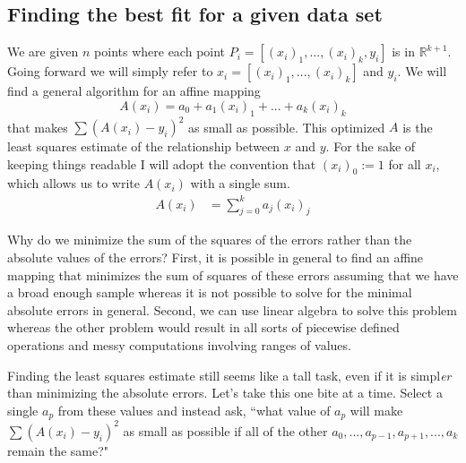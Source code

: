 \subsection{Finding the best fit for a given data set}

We are given $n$ points where each point $P_i=[(x_i)_1,...,(x_i)_k,y_i]$ is in $\mathbb{R}^{k+1}$. Going forward we will simply refer to $x_i=[(x_i)_1,...,(x_i)_k]$ and $y_i$. We will find a general algorithm for an affine mapping
$$A(x_i)=a_0+a_1(x_i)_1+...+a_k(x_i)_k$$
that makes $\sum(A(x_i) - y_i)^2$ as small as possible. This optimized $A$ is the least squares estimate of the relationship between $x$ and $y$. For the sake of keeping things readable I will adopt the convention that $(x_i)_0:=1$ for all $x_i$, which allows us to write $A(x_i)$ with a single sum.
\begin{align}
	A(x_i)&=\sum_{j=0}^ka_j(x_i)_j\label{A as sum}
\end{align}

Why do we minimize the sum of the squares of the errors rather than the absolute values of the errors? First, it is possible in general to find an affine mapping that minimizes the sum of squares of these errors assuming that we have a broad enough sample whereas it is not possible to solve for the minimal absolute errors in general. Second, we can use linear algebra to solve this problem whereas the other problem would result in all sorts of piecewise defined operations and messy computations involving ranges of values.

Finding the least squares estimate still seems like a tall task, even if it is simpl\emph{er} than minimizing the absolute errors. Let's take this one bite at a time. Select a single $a_p$ from these values and instead ask, ``what value of $a_p$ will make $\sum(A(x_i) - y_i)^2$ as small as possible if all of the other $a_0,...,a_{p-1},a_{p+1},...,a_k$ remain the same?"

